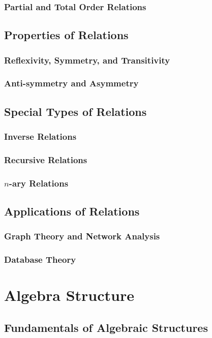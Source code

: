 \subsubsection{Partial and Total Order Relations}
\subsection{Properties of Relations}
\subsubsection{Reflexivity, Symmetry, and Transitivity}
\subsubsection{Anti-symmetry and Asymmetry}
\subsection{Special Types of Relations}
\subsubsection{Inverse Relations}
\subsubsection{Recursive Relations}
\subsubsection{\(n\)-ary Relations}
\subsection{Applications of Relations}
\subsubsection{Graph Theory and Network Analysis}
\subsubsection{Database Theory}

\section{Algebra Structure}
\lipsum
\subsection{Fundamentals of Algebraic Structures}
